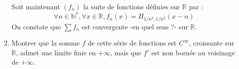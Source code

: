 \begin{exer}
\begin{enumerate}
\begin{enumerate}
\medskip
Soit maintenant $(f_n)$ la suite de fonctions définies sur $\mathbb{R}$ par :
\[\forall n \in \mathbb{N}^* , \forall x \in \mathbb{R} , f_n(x) = H_{1/n^3 , 1/n^2} (x - n)\]
On constate que $\sum f_n$ est convergente -en quel sens ?- sur $\mathbb{R}$.
\item Montrer que la somme $f$ de cette série de fonctions est $C^{\infty}$, croissante sur $\mathbb{R}$, admet une limite finie en $+ \infty$, mais que $f'$ est non bornée au voisinage de $+ \infty$.\\
\end{enumerate}
\end{enumerate}
\end{exer}


